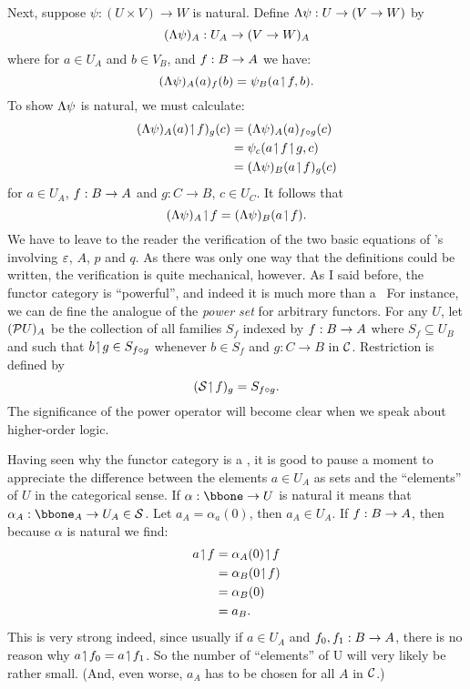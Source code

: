 Next, suppose $\psi: (U \times V) \to W$ is natural. Define
$\Lambda \psi  : U\rightarrow (V\rightarrow W)$ by
%
$$
(\Lambda \psi)_A: U_A \rightarrow (V \rightarrow W)_A
$$
%
where for $a \in U_A$ and $b \in V_B$, and $f: B \rightarrow A$ we have:
$$
(\Lambda \psi)_A (a)_f (b) = \psi_B (a \!\upharpoonleft\! f, b).
$$
To show $\Lambda\psi$ is natural, we must calculate:
\begin{align*}
(\L \psi)_A (a)\res f)_g (c) &= (\L \psi)_A(a)_{f \comp g} (c)\\
&= \psi_c(a \res f \res g,c)\\
&= (\L \psi)_B(a \res f)_g (c)
\end{align*}
%
for $a \in U_A$, $f : B \rightarrow A$ and $g: C\to B$, $c \in U_C$. It follows that
$$
(\Lambda \psi)_A \!\upharpoonleft\! f = (\Lambda \psi)_B (a \!\upharpoonleft\! f).
$$
%
We have to leave to the reader the verification of the two basic equations of \ccc's involving $\varepsilon$, $A$, $p$ and $q$. As there was only one way that the definitions could be written, the verification is quite mechanical, however.
As I said before, the functor category is ``powerful'', and indeed it is much more than a \ccc\  For instance, we can de fine the analogue of the {\it power set} for arbitrary functors. For any $U$, let $(\mathcal P U)_A$ be the collection of all families $S_f$ indexed by $f: B \rightarrow A$ where $S_f \subseteq U_B$ and such that $b\!\upharpoonleft\! g \in S_{f \circ g}$ whenever $b\in S_f$ and $g: C\to B$ in $\mathcal C$. Restriction is defined by
$$
(\mathcal S \!\upharpoonleft\! f)_g = S_{f \circ g}.
$$
%
The significance of the power operator will become clear when we speak about higher-order logic.

Having seen why the functor category is a \ccc, it is good to pause a moment to appreciate the difference between the elements $a \in U_A$ as sets and the ``elements'' of $U$ in the categorical sense. If $\alpha : \bbone \to U$ is natural it means that $\alpha_A  : \bbone_A  \to U_A \in \S$. Let $a_A = \alpha_a(0)$, then $a_A \in U_A$. If $f:B \rightarrow A$, then because $\alpha$ is natural we find:
\begin{align*}
a \!\upharpoonleft\! f &= \alpha_A(0) \!\upharpoonleft\! f\\
&= \alpha_B(0 \!\upharpoonleft\! f)\\
&= \alpha_B(0)\\
&= a_B .
\end{align*}
This is very strong indeed, since usually if $a \in U_A$ and $f_0, f_1 :B \rightarrow A$, there is no reason why $a \!\upharpoonleft\! f_0 = a \!\upharpoonleft\! f_1$.
So the number of ``elements'' of U will very likely be rather small. (And, even worse, $a_A$ has to be chosen for all $A$ in $\mathcal C$.)

